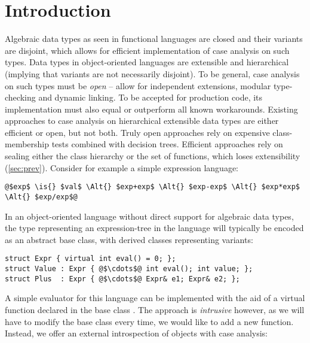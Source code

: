 \section{Introduction} %
\label{sec:intro}


Algebraic data types as seen in functional languages are closed and their 
variants are disjoint, which allows for efficient implementation of case analysis 
on such types. Data types in object-oriented languages are extensible
and hierarchical (implying that variants are not necessarily 
disjoint). 
To be general, case analysis on such types must be \emph{open} -- allow for 
independent extensions, modular type-checking and dynamic linking. To be 
accepted for production code, its implementation must also equal or outperform 
all known workarounds. Existing approaches to case analysis on hierarchical 
extensible data types are either efficient or open, but not both.
Truly open approaches rely on expensive class-membership tests combined with 
decision trees. Efficient approaches rely on sealing either the class 
hierarchy or the set of functions, which loses extensibility (\textsection\ref{sec:prev}). %
Consider for example a simple expression language: 

\begin{lstlisting}
@$exp$ \is{} $val$ \Alt{} $exp+exp$ \Alt{} $exp-exp$ \Alt{} $exp*exp$ \Alt{} $exp/exp$@
\end{lstlisting}

\noindent 
In an object-oriented language without direct support for algebraic data types, 
the type representing an expression-tree in the language will typically be 
encoded as an abstract base class, %
with derived classes representing variants:

\begin{lstlisting}[keepspaces,columns=flexible]
struct Expr { virtual int eval() = 0; };
struct Value : Expr { @$\cdots$@ int eval(); int value; };
struct Plus  : Expr { @$\cdots$@ Expr& e1; Expr& e2; };
\end{lstlisting}

\noindent
A simple evaluator for this language can be implemented with the aid of a
virtual function  declared in the base class . 
The approach is \emph{intrusive} however, as we will have to modify the base class every 
time, we would like to add a new function. 
Instead, we offer an external introspection of objects with case analysis:

